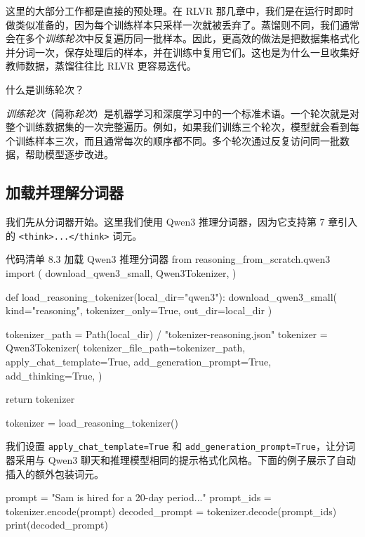 这里的大部分工作都是直接的预处理。在 RLVR 那几章中，我们是在运行时即时做类似准备的，因为每个训练样本只采样一次就被丢弃了。蒸馏则不同，我们通常会在多个\emph{训练轮次}中反复遍历同一批样本。因此，更高效的做法是把数据集格式化并分词一次，保存处理后的样本，并在训练中复用它们。这也是为什么一旦收集好教师数据，蒸馏往往比 RLVR 更容易迭代。

\begin{mySidebar}{什么是训练轮次？}

\emph{训练轮次}（简称\emph{轮次}）是机器学习和深度学习中的一个标准术语。一个轮次就是对整个训练数据集的一次完整遍历。例如，如果我们训练三个轮次，模型就会看到每个训练样本三次，而且通常每次的顺序都不同。多个轮次通过反复访问同一批数据，帮助模型逐步改进。

\end{mySidebar}

\subsection{加载并理解分词器}

我们先从分词器开始。这里我们使用 Qwen3 推理分词器，因为它支持第 7 章引入的 \texttt{\textless{}think\textgreater{}...\textless{}/think\textgreater{}} 词元。

\begin{codeboxt}{代码清单 8.3 加载 Qwen3 推理分词器}
from reasoning_from_scratch.qwen3 import (
    download_qwen3_small,
    Qwen3Tokenizer,
)

def load_reasoning_tokenizer(local_dir="qwen3"):
    download_qwen3_small(
        kind="reasoning", tokenizer_only=True, out_dir=local_dir
    )

    tokenizer_path = Path(local_dir) / "tokenizer-reasoning.json"
    tokenizer = Qwen3Tokenizer(
        tokenizer_file_path=tokenizer_path,
        apply_chat_template=True,
        add_generation_prompt=True,
        add_thinking=True,
    )

    return tokenizer

tokenizer = load_reasoning_tokenizer()
\end{codeboxt}

我们设置 \texttt{apply\_chat\_template=True} 和 \texttt{add\_generation\_prompt=True}，让分词器采用与 Qwen3 聊天和推理模型相同的提示格式化风格。下面的例子展示了自动插入的额外包装词元。

\begin{codebox}
prompt = "Sam is hired for a 20-day period..."
prompt_ids = tokenizer.encode(prompt)
decoded_prompt = tokenizer.decode(prompt_ids)
print(decoded_prompt)
\end{codebox}


